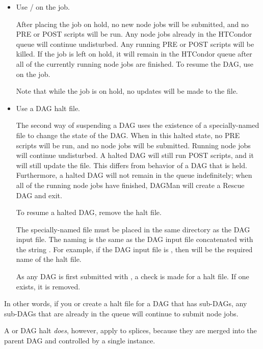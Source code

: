 \begin{itemize}
\item Use / on the  job.

After placing the  job on hold,
no new node jobs will be submitted,
and no PRE or POST scripts will be run.
Any node jobs already in the HTCondor queue will continue undisturbed.
Any running PRE or POST scripts will be killed.
If the  job is left on hold,
it will remain in the HTCondor queue after all of the currently running
node jobs are finished.
To resume the DAG, use  on the  job.

Note that while the  job is on hold,
no updates will be made to the  file.

\item Use a DAG halt file.

The second way of suspending a DAG uses the existence of a specially-named
file to change the state of the DAG.
When in this halted state,
no PRE scripts will be run, and no node jobs will be submitted.  
Running node jobs will continue undisturbed.
A halted DAG will still run POST scripts,
and it will still update the  file.
This differs from behavior of a DAG that is held.
Furthermore, a halted DAG will not remain in the queue indefinitely;
when all of the running node jobs have finished, 
DAGMan will create a Rescue DAG and exit.

To resume a halted DAG, remove the halt file.

The specially-named file must be placed in the same directory
as the DAG input file.
The naming is the same as the DAG input file concatenated with the
string .
For example, if the DAG input file is , 
then  will be the required name of the halt file.

As any DAG is first submitted with , 
a check is made for a halt file.
If one exists, it is removed.
\end{itemize}

In other words, if you  or create a halt file for a DAG that
has sub-DAGs, any sub-DAGs that are already in the queue will continue
to submit node jobs.

A  or DAG halt \emph{does}, however, apply to splices,
because they are merged into the parent DAG and controlled by a single
 instance.

